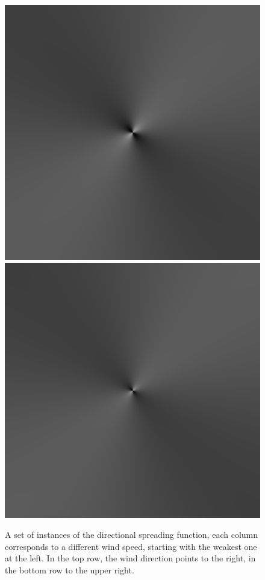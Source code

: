 \begin{figure}
{ }
 \hfill
 \subtop
 {
 \includegraphics[scale=0.25]{figures/unified_dfilt_wur_sqrt50.png}
 }
 \hfill
 \subtop
 {
 \includegraphics[scale=0.25]{figures/unified_dfilt_wur_sqrt200.png}
 }
\caption{A set of instances of the directional spreading function, each column 
corresponds to a different wind speed, starting with the weakest one at the 
left. In the top row, the wind direction points to the right, in the bottom row 
to the upper right.}
\label{fig:unified_directional_filter}
\end{figure}
%
